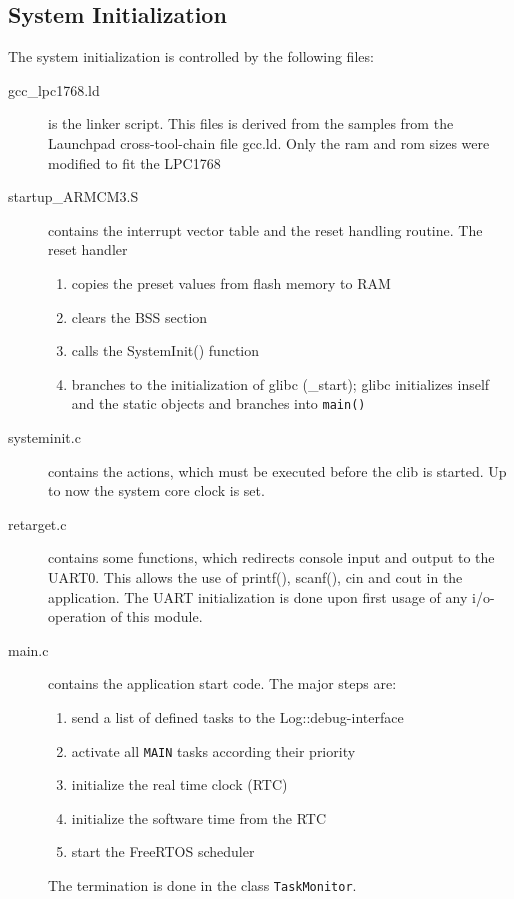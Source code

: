 \subsection{System Initialization}
The system initialization  is controlled by the following files:
\begin{description}
\item[gcc\_lpc1768.ld] is the linker script. This files is derived from
   the samples from the Launchpad cross-tool-chain file gcc.ld. 
   Only the ram and rom sizes were modified to fit the LPC1768 
\item[startup\_ARMCM3.S] contains the interrupt vector table and the 
   reset handling routine. The reset handler 
   \begin{enumerate}
   \item copies the preset values from flash memory to RAM
   \item clears the BSS section 
   \item  calls the SystemInit() function
   \item  branches to the initialization of glibc (\_start); glibc
      initializes inself and the static objects and branches into \verb|main()|
   \end{enumerate}
\item[systeminit.c] contains the actions, which must be executed
   before the clib is started. Up to now the system core clock is 
   set.
\item [retarget.c] contains some functions, which redirects console 
   input and output to the UART0.  This allows the use of printf(), 
   scanf(), cin and cout in the application. The UART initialization is done 
   upon first usage of any i/o-operation of this module.
\item[main.c] contains the application start code. The major steps are:
  \begin{enumerate}
  \item send a list of defined tasks to the Log::debug-interface
  \item activate all \verb|MAIN| tasks according their priority
  \item initialize the real time clock (RTC)
  \item initialize the software time from the RTC
  \item start the FreeRTOS scheduler 
  \end{enumerate}
  The termination is done in the class \verb|TaskMonitor|. 
\end{description}

